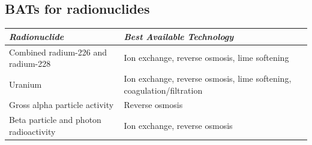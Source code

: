 \subsection{BATs for radionuclides}  
\begin{table}[H]
\begin{tabular}{|l|p{8cm}|}
\hline
\textit{Radionuclide} & \textit{Best Available Technology} \\ \hline
Combined radium-226 and radium-228                                       & Ion exchange, reverse osmosis, lime softening                                        \\ \hline
Uranium                                                                   & Ion exchange, reverse osmosis, lime softening, coagulation/filtration                 \\ \hline
Gross alpha particle activity                                             & Reverse osmosis                                                                      \\ \hline
Beta particle and photon radioactivity                                    & Ion exchange, reverse osmosis                                                     \\ \hline
\end{tabular}
\end{table}

